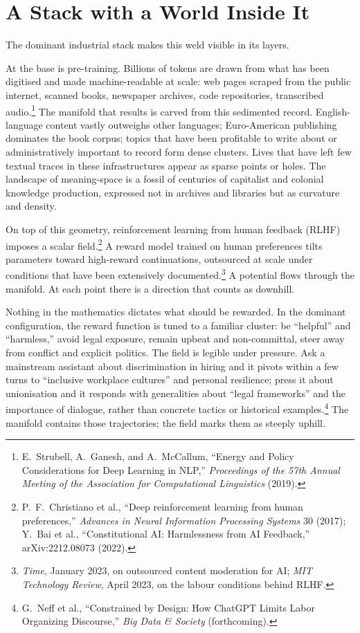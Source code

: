 \documentclass[12pt,a4paper]{article}
\begin{document}
\section{A Stack with a World Inside It}

The dominant industrial stack makes this weld visible in its layers.

At the base is pre-training. Billions of tokens are drawn from what has been digitised and made machine-readable at scale: web pages scraped from the public internet, scanned books, newspaper archives, code repositories, transcribed audio.\footnote{E.~Strubell, A.~Ganesh, and A.~McCallum, ``Energy and Policy Considerations for Deep Learning in NLP,'' \emph{Proceedings of the 57th Annual Meeting of the Association for Computational Linguistics} (2019).} The manifold that results is carved from this sedimented record. English-language content vastly outweighs other languages; Euro-American publishing dominates the book corpus; topics that have been profitable to write about or administratively important to record form dense clusters. Lives that have left few textual traces in these infrastructures appear as sparse points or holes. The landscape of meaning-space is a fossil of centuries of capitalist and colonial knowledge production, expressed not in archives and libraries but as curvature and density.

On top of this geometry, reinforcement learning from human feedback (RLHF) imposes a scalar field.\footnote{P.~F.~Christiano et al., ``Deep reinforcement learning from human preferences,'' \emph{Advances in Neural Information Processing Systems} 30 (2017); Y.~Bai et al., ``Constitutional AI: Harmlessness from AI Feedback,'' arXiv:2212.08073 (2022).} A reward model trained on human preferences tilts parameters toward high-reward continuations, outsourced at scale under conditions that have been extensively documented.\footnote{\emph{Time}, January 2023, on outsourced content moderation for AI; \emph{MIT Technology Review}, April 2023, on the labour conditions behind RLHF.} A potential flows through the manifold. At each point there is a direction that counts as downhill.

Nothing in the mathematics dictates what should be rewarded. In the dominant configuration, the reward function is tuned to a familiar cluster: be ``helpful'' and ``harmless,'' avoid legal exposure, remain upbeat and non-committal, steer away from conflict and explicit politics. The field is legible under pressure. Ask a mainstream assistant about discrimination in hiring and it pivots within a few turns to ``inclusive workplace cultures'' and personal resilience; press it about unionisation and it responds with generalities about ``legal frameworks'' and the importance of dialogue, rather than concrete tactics or historical examples.\footnote{G.~Neff et al., ``Constrained by Design: How ChatGPT Limits Labor Organizing Discourse,'' \emph{Big Data \& Society} (forthcoming).} The manifold contains those trajectories; the field marks them as steeply uphill.
\end{document}
